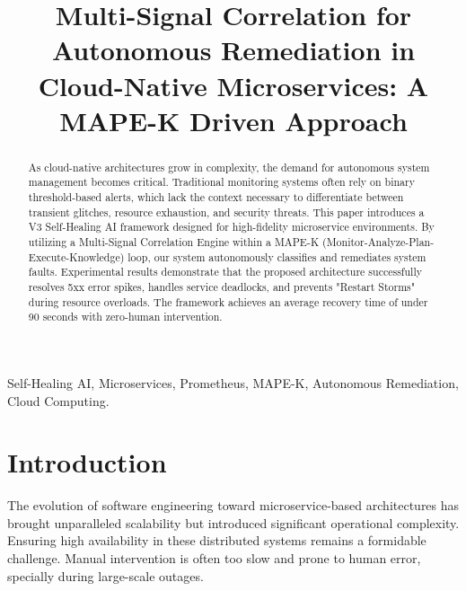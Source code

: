 \documentclass[conference]{IEEEtran}
\begin{document}
\title{Multi-Signal Correlation for Autonomous Remediation in Cloud-Native Microservices: A MAPE-K Driven Approach\\}

\author{
\and
{}
}

\maketitle

\begin{abstract}
As cloud-native architectures grow in complexity, the demand for autonomous system management becomes critical. Traditional monitoring systems often rely on binary threshold-based alerts, which lack the context necessary to differentiate between transient glitches, resource exhaustion, and security threats. This paper introduces a V3 Self-Healing AI framework designed for high-fidelity microservice environments. By utilizing a Multi-Signal Correlation Engine within a MAPE-K (Monitor-Analyze-Plan-Execute-Knowledge) loop, our system autonomously classifies and remediates system faults. Experimental results demonstrate that the proposed architecture successfully resolves 5xx error spikes, handles service deadlocks, and prevents "Restart Storms" during resource overloads. The framework achieves an average recovery time of under 90 seconds with zero-human intervention.
\end{abstract}

\begin{IEEEkeywords}
Self-Healing AI, Microservices, Prometheus, MAPE-K, Autonomous Remediation, Cloud Computing.
\end{IEEEkeywords}

\section{Introduction}
The evolution of software engineering toward microservice-based architectures has brought unparalleled scalability but introduced significant operational complexity. Ensuring high availability in these distributed systems remains a formidable challenge. Manual intervention is often too slow and prone to human error, specially during large-scale outages.
\end{document}
